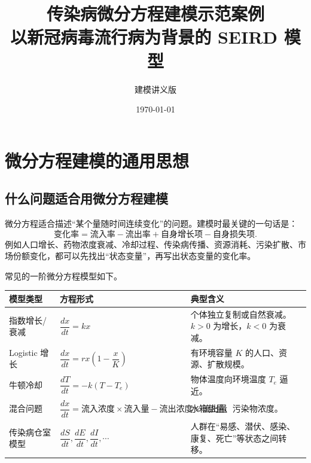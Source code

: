 \documentclass[UTF8,12pt,a4paper]{ctexart}
\title{\heiti 传染病微分方程建模示范案例\\[0.4em]
\Large 以新冠病毒流行病为背景的 SEIRD 模型}
\author{建模讲义版}
\date{\today}
\begin{document}
\maketitle
\begin{center}
\end{center}
\tableofcontents
\newpage

\section{微分方程建模的通用思想}
\subsection{什么问题适合用微分方程建模}
微分方程适合描述“某个量随时间连续变化”的问题。建模时最关键的一句话是：
\[
\text{变化率}=\text{流入率}-\text{流出率}+\text{自身增长项}-\text{自身损失项}.
\]
例如人口增长、药物浓度衰减、冷却过程、传染病传播、资源消耗、污染扩散、市场份额变化，都可以先找出“状态变量”，再写出状态变量的变化率。

常见的一阶微分方程模型如下。
\begin{longtable}{p{3.2cm}p{5.2cm}p{6.4cm}}
\toprule
模型类型 & 方程形式 & 典型含义 \\
\midrule
指数增长/衰减 & $\dfrac{dx}{dt}=kx$ & 个体独立复制或自然衰减。$k>0$ 为增长，$k<0$ 为衰减。\\
Logistic 增长 & $\dfrac{dx}{dt}=rx\left(1-\dfrac{x}{K}\right)$ & 有环境容量 $K$ 的人口、资源、扩散规模。\\
牛顿冷却 & $\dfrac{dT}{dt}=-k(T-T_e)$ & 物体温度向环境温度 $T_e$ 逼近。\\
混合问题 & $\dfrac{dx}{dt}=\text{流入浓度}\times\text{流入量}-\text{流出浓度}\times\text{流出量}$ & 水箱盐量、污染物浓度。\\
传染病仓室模型 & $\dfrac{dS}{dt},\dfrac{dE}{dt},\dfrac{dI}{dt},\cdots$ & 人群在“易感、潜伏、感染、康复、死亡”等状态之间转移。\\
\bottomrule
\end{longtable}
\end{document}
